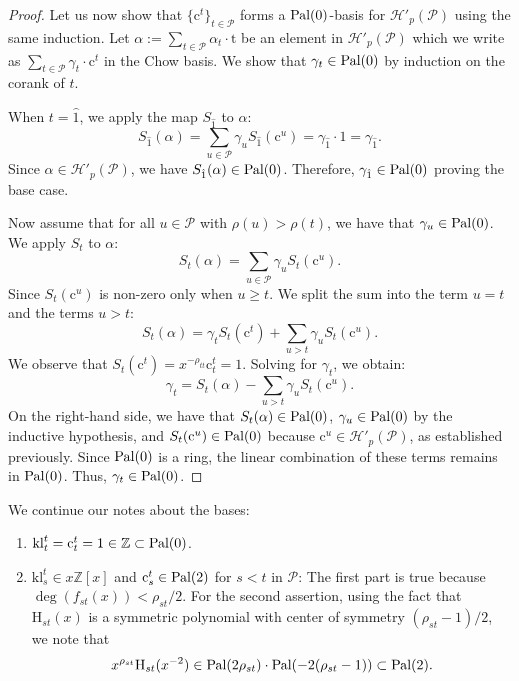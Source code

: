 \documentclass[12pt,letterpaper,english]{amsart}
\theoremstyle{teoremas}
\theoremstyle{definition}
\renewcommand{\H}{\mathrm{H}}
\newcommand{\cH}{\mathcal{H}}
\newcommand{\calP}{\mathcal{P}}
\newcommand{\ZZ}{\mathbb{Z}}
\newcommand{\Ebasis}[1]{\mathrm{#1}}
\newcommand{\Cbasis}[1]{\mathrm{c}^{#1}}
\newcommand{\CbasisSub}[2]{\mathrm{c}^{#1}_{#2}}
\newcommand{\klbasisSub}[2]{\mathrm{kl}^{#1}_{#2}}
\newcommand{\pal}{\normalfont\text{Pal}}
\begin{document}
\begin{proof}
    \noindent Let us now show that \(\{\Cbasis{t}\}_{t\in\calP}\) forms a
    \(\pal(0)\)-basis for \(\cH'_p(\calP)\) using the same induction. Let
    \(\alpha:=\sum_{t\in\calP}{\alpha_t\cdot\Ebasis{t}}\) be an element in
    \(\cH'_p(\calP)\) which we write as \(\sum_{t\in\calP}{\gamma_t\cdot\Cbasis{t}}\)
    in the Chow basis. We show that \(\gamma_t\in\pal(0)\) by induction on the corank of \(t\).

    \noindent When \(t=\hat{1}\), we apply the map \(S_{\hat{1}}\) to \(\alpha\):
    \[S_{\hat{1}}(\alpha) = \sum_{u \in \calP} \gamma_u S_{\hat{1}}(\Cbasis{u})= \gamma_{\hat{1}} \cdot 1 = \gamma_{\hat{1}}.\]
    Since \(\alpha \in \cH'_p(\calP)\), we have \(S_{\hat{1}}(\alpha) \in \pal(0)\). Therefore, \(\gamma_{\hat{1}} \in \pal(0)\)
    proving the base case.

    \noindent Now assume that for all \(u \in \calP\) with
    \(\rho(u) > \rho(t)\), we have that \(\gamma_u \in \pal(0)\).
    We apply \(S_t\) to \(\alpha\):
    \[ S_t(\alpha) = \sum_{u \in \calP} \gamma_u S_t(\Cbasis{u}). \]
    Since \(S_t(\Cbasis{u})\) is non-zero only when \(u \ge t\). We split the sum into the term \(u=t\) and the terms \(u > t\):
    \[ S_t(\alpha) = \gamma_t S_t(\Cbasis{t}) + \sum_{u > t} \gamma_u S_t(\Cbasis{u}). \]
    We observe that \(S_t(\Cbasis{t}) = x^{-\rho_{tt}}\CbasisSub{t}{t} = 1\). Solving for \(\gamma_t\), we obtain:
    \[ \gamma_t = S_t(\alpha) - \sum_{u > t} \gamma_u S_t(\Cbasis{u}). \]
    On the right-hand side, we have that
    \(S_t(\alpha) \in \pal(0)\), \(\gamma_u \in \pal(0)\) by the inductive hypothesis,
    and \(S_t(\Cbasis{u}) \in \pal(0)\) because \(\Cbasis{u} \in \cH'_p(\calP)\), as established previously.
    Since \(\pal(0)\) is a ring, the linear combination of these terms remains in \(\pal(0)\). Thus, \(\gamma_t \in \pal(0)\).
\end{proof}
\noindent We continue our notes about the bases:
\begin{enumerate}[resume]
    \item \(\klbasisSub{t}{t} = \CbasisSub{t}{t} = 1 \in \ZZ\subset\pal(0)\).
    \item \(\klbasisSub{t}{s} \in x\ZZ[x]\) and \(\CbasisSub{t}{s} \in \pal(2)\)
          for \(s<t\) in \(\calP\): The first part is true because \(\deg(f_{st}(x))
          <\rho_{st}/2\). For the second assertion, using the fact that
          \(\H_{st}(x)\) is a symmetric polynomial with center of symmetry
          \((\rho_{st}-1)/2\), we note that
          \[x^{\rho_{st}}\H_{st}(x^{-2}) \in \pal(2\rho_{st})\cdot\pal(-2(\rho_{st}-1))\subset\pal(2).\]
\end{enumerate}
\end{document}
